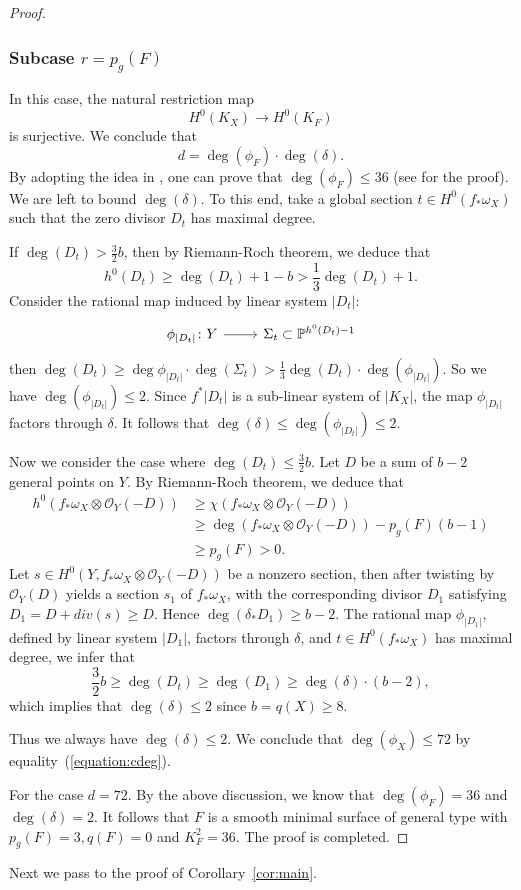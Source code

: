\documentclass[11pt]{amsart}
\theoremstyle{plain}
\theoremstyle{definition}
\numberwithin{equation}{section}
\newcommand{\PP}{\mathbb{P}}
\newcommand{\sO}{\mathcal{O}}
\begin{document}
\begin{proof}
\subsubsection*{Subcase $r=p_g(F)$} In this case, the natural restriction map $$H^0(K_X)\to H^0(K_F)$$
is surjective. We conclude that
\begin{equation}\label{equation:cdeg}
    d=\deg(\phi_F)\cdot\deg(\delta).
\end{equation}
By adopting the idea in \cite{Bea79}, one can prove that $\deg(\phi_F)\leq 36$ (see \cite[Proposition 1.1]{LY21} for the proof).
We are left to bound $\deg(\delta)$. To this end, take a global section $t\in H^0(f_{\ast}\omega_X)$ such that the zero divisor $D_t$  has maximal degree.

If $\deg (D_t)>\frac{3}{2}b$, then by Riemann-Roch theorem, we deduce that
\[
h^0(D_t)\geq \deg (D_t)+1-b>\frac{1}{3}\deg (D_t)+1.
\]
Consider the rational map induced by linear system $|D_t|$:
\[
\begin{tikzcd}
\phi_{|D_t|} \colon  Y \arrow[r] & \Sigma_t\subset\PP^{h^0(D_t)-1}
\end{tikzcd}
\]
then $\deg (D_t)\geq \deg\phi_{|D_t|}\cdot\deg(\Sigma_t)>\frac{1}{3}\deg (D_t)\cdot \deg(\phi_{|D_t|})$. So we have $ \deg(\phi_{|D_t|})\leq 2$.  Since $f^{\ast}|D_t|$ is a sub-linear system of $|K_X|$, the map $\phi_{|D_t|}$ factors through $\delta$. It follows that $\deg(\delta)\leq\deg (\phi_{|D_t|})\leq 2$.

Now we consider the case where $\deg (D_t)\leq \frac{3}{2}b$. Let $D$ be a sum of $b-2$ general points on $Y$. By Riemann-Roch theorem, we deduce that 
\begin{align*}
h^0(f_{\ast}\omega_X\otimes\sO_Y(-D))&\geq \chi(f_{\ast}\omega_X\otimes\sO_Y(-D))\\
&\geq \deg( f_{\ast}\omega_X\otimes\sO_Y(-D))-p_g(F)(b-1)\\
    &\geq p_g(F)>0.
\end{align*}
Let $s\in H^0(Y,f_{\ast}\omega_X\otimes\sO_Y(-D))$ be a nonzero section, then after twisting by $\sO_Y(D)$ yields a section $s_1$ of $f_{\ast}\omega_X$, with the corresponding divisor $D_1$ satisfying $D_1=D+div(s)\geq D$. Hence $\deg (\delta_{\ast}D_1)\geq b-2$. The rational map $\phi_{|D_1|}$, defined by linear system $|D_1|$, factors through $\delta$, and $t\in H^0(f_{\ast}\omega_X)$ has maximal degree, we infer that
\[
\frac{3}{2}b\geq \deg (D_t)\geq \deg (D_1)\geq\deg(\delta)\cdot(b-2),
\]
which implies that $\deg(\delta)\leq 2$ since $b=q(X)\geq 8$. 

 Thus we always have $\deg(\delta)\leq 2$. We conclude that $\deg(\phi_X)\leq 72$ by equality~(\ref{equation:cdeg}).

For the case $d=72$. By the above discussion, we know that $\deg (\phi_F)=36$ and $\deg(\delta)=2$. It follows that $F$ is a smooth minimal   surface of general type with $p_g(F)=3, q(F)=0$ and $K_F^2=36$. The proof is completed.
\end{proof}
\iffalse
Next we pass to the proof of Corollary~\ref{cor:main}.
\end{document}
